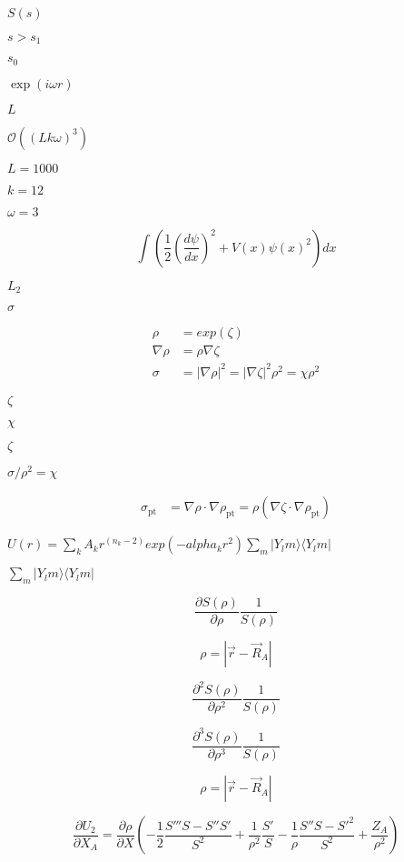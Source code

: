 \documentclass{article}
\begin{document}
$S(s)$
\pagebreak

$s>s_{1}$
\pagebreak

$s_{0}$
\pagebreak

$ \exp(i\omega r)$
\pagebreak

$L$
\pagebreak

$\mathcal{O}\left(\left(Lk\omega \right)^{3}\right)$
\pagebreak

$L=1000$
\pagebreak

$k=12$
\pagebreak

$\omega=3$
\pagebreak

\[ \int \left( \frac{1}{2} \left( \frac{d\psi}{dx} \right)^{2} + V(x)\psi (x)^{2} \right) \mathit{dx} \]
\pagebreak

$L_{2}$
\pagebreak

$ \sigma$
\pagebreak

\begin{align} \rho &= exp(\zeta) \\ \nabla \rho &= \rho \nabla \zeta \\ \sigma &= |\nabla\rho|^2 = |\nabla \zeta|^2 \rho^2 = \chi \rho^2 \end{align}
\pagebreak

$ \zeta$
\pagebreak

$ \chi $
\pagebreak

$\zeta$
\pagebreak

$ \sigma/\rho^2 =\chi$
\pagebreak

\begin{align} \sigma_\mathrm{pt} &=\nabla\rho\cdot\nabla\rho_\mathrm{pt} = \rho\left(\nabla\zeta\cdot\nabla\rho_\mathrm{pt}\right) \end{align}
\pagebreak

$ U(r) = \sum_k A_k r^(n_k-2) exp(-alpha_k r^2) \sum_m |Y_lm \rangle \langle Y_lm| $
\pagebreak

$\sum_m |Y_lm \rangle \langle Y_lm|$
\pagebreak

\[ \frac{\partial S(\rho)}{\partial \rho} \frac{1}{S(\rho)} \]
\pagebreak

\[ \rho = |\vec r - \vec R_A | \]
\pagebreak

\[ \frac{\partial^2 S(\rho)}{\partial \rho^2} \frac{1}{S(\rho)} \]
\pagebreak

\[ \frac{\partial^3 S(\rho)}{\partial \rho^3} \frac{1}{S(\rho)} \]
\pagebreak

\[ \rho = \left| \vec r- \vec R_A \right| \]
\pagebreak

\[ \frac{\partial U_2}{\partial X_A} = \frac{\partial \rho}{\partial X} \left(-\frac{1}{2}\frac{S''' S - S'' S'}{S^2} + \frac{1}{\rho^2}\frac{S'}{S} - \frac{1}{\rho} \frac{S''S - S'^2}{S^2} + \frac{Z_A}{\rho^2}\right) \]
\pagebreak
\end{document}
